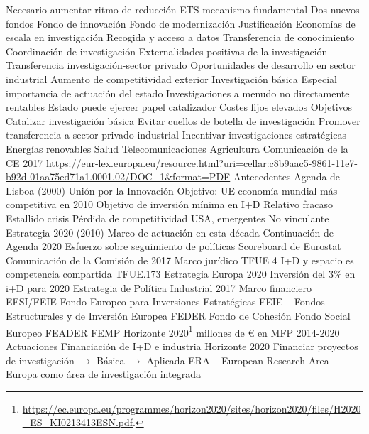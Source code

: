 \documentclass{nuevotema}
\begin{document}
\begin{esquemal}
				\4 Necesario aumentar ritmo de reducción
				\4 ETS mecanismo fundamental
				\4 Dos nuevos fondos
				\4[] Fondo de innovación
				\4[] Fondo de modernización
	\1 
		\2 Justificación
			\3 Economías de escala en investigación
				\4 Recogida y acceso a datos
				\4 Transferencia de conocimiento
				\4 Coordinación de investigación
			\3 Externalidades positivas de la investigación
				\4 Transferencia investigación-sector privado
				\4 Oportunidades de desarrollo en sector industrial
				\4 Aumento de competitividad exterior
			\3 Investigación básica
				\4 Especial importancia de actuación del estado
				\4 Investigaciones a menudo no directamente rentables
				\4 Estado puede ejercer papel catalizador
				\4 Costes fijos elevados
		\2 Objetivos
			\3 Catalizar investigación básica
				\4 Evitar cuellos de botella de investigación
			\3 Promover transferencia a sector privado industrial
			\3 Incentivar investigaciones estratégicas
				\4 Energías renovables
				\4 Salud
				\4 Telecomunicaciones
				\4 Agricultura
			\3 Comunicación de la CE 2017
				\4 \url{https://eur-lex.europa.eu/resource.html?uri=cellar:c8b9aac5-9861-11e7-b92d-01aa75ed71a1.0001.02/DOC_1&format=PDF}
		\2 Antecedentes
			\3 Agenda de Lisboa (2000)
				\4 Unión por la Innovación
				\4 Objetivo:
				\4[] UE economía mundial más competitiva en 2010
				\4 Objetivo de inversión mínima en I+D
				\4 Relativo fracaso
				\4[] Estallido crisis
				\4[] Pérdida de competitividad USA, emergentes
				\4[] No vinculante
			\3 Estrategia 2020 (2010)
				\4 Marco de actuación en esta década
				\4 Continuación de Agenda 2020
				\4 Esfuerzo sobre seguimiento de políticas
				\4[] Scoreboard de Eurostat
			\3 Comunicación de la Comisión de 2017
		\2 Marco jurídico
			\3 TFUE 4
				\4 I+D y espacio es competencia compartida
			\3 TFUE.173
			\3 Estrategia Europa 2020
				\4 Inversión del 3\% en i+D para 2020
			\3 Estrategia de Política Industrial 2017
		\2 Marco financiero
			\3 EFSI/FEIE
				\4 Fondo Europeo para Inversiones Estratégicas
			\3 FEIE -- Fondos Estructurales y de Inversión Europea
				\4 FEDER
				\4 Fondo de Cohesión
				\4 Fondo Social Europeo
				\4 FEADER
				\4 FEMP
			\3 Horizonte 2020\footnote{\url{https://ec.europa.eu/programmes/horizon2020/sites/horizon2020/files/H2020_ES_KI0213413ESN.pdf}.}
				 millones de € en MFP 2014-2020
		\2 Actuaciones
			\3 Financiación de I+D e industria
			\3 Horizonte 2020
				\4[] Financiar proyectos de investigación
				\4[] $\to$ Básica
				\4[] $\to$ Aplicada
			\3 ERA -- European Research Area
				\4 Europa como área de investigación integrada

\end{esquemal}
\end{document}
